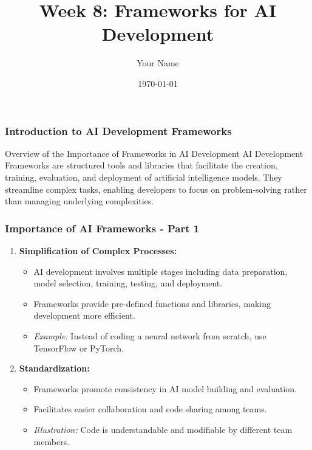 \documentclass{beamer}
\title{Week 8: Frameworks for AI Development}
\author{Your Name}
\institute{Your Institution}
\date{\today}
\begin{document}
\frame{\titlepage}

\begin{frame}[fragile]
    \frametitle{Introduction to AI Development Frameworks}
    \begin{block}{Overview of the Importance of Frameworks in AI Development}
        AI Development Frameworks are structured tools and libraries that facilitate the creation, training, evaluation, and deployment of artificial intelligence models. They streamline complex tasks, enabling developers to focus on problem-solving rather than managing underlying complexities.
    \end{block}
\end{frame}

\begin{frame}[fragile]
    \frametitle{Importance of AI Frameworks - Part 1}
    \begin{enumerate}
        \item \textbf{Simplification of Complex Processes:}
            \begin{itemize}
                \item AI development involves multiple stages including data preparation, model selection, training, testing, and deployment.
                \item Frameworks provide pre-defined functions and libraries, making development more efficient.
                \item \textit{Example:} Instead of coding a neural network from scratch, use TensorFlow or PyTorch.
            \end{itemize}
        
        \item \textbf{Standardization:}
            \begin{itemize}
                \item Frameworks promote consistency in AI model building and evaluation.
                \item Facilitates easier collaboration and code sharing among teams.
                \item \textit{Illustration:} Code is understandable and modifiable by different team members.
            \end{itemize}
    \end{enumerate}
\end{frame}
\end{document}
